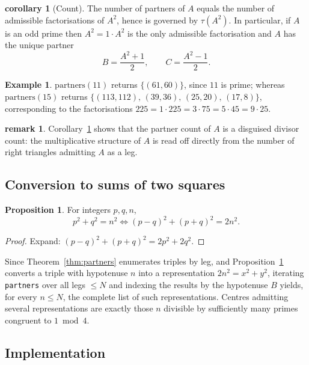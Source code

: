 \documentclass[11pt]{article}
\theoremstyle{definition}
\newtheorem{proposition}{Proposition}
\newtheorem{example}{Example}
\newtheorem{remark}{remark}
\newtheorem{corollary}{corollary}
\begin{document}
\begin{corollary}[Count]\label{cor:count}
The number of partners of $A$ equals the number of admissible factorisations
of $A^2$, hence is governed by $\tau(A^2)$. In particular, if $A$ is an odd
prime then $A^2 = 1 \cdot A^2$ is the only admissible factorisation and $A$ has
the unique partner
\[
  B = \frac{A^2+1}{2}, \qquad C = \frac{A^2-1}{2}.
\]
\end{corollary}

\begin{example}
$\mathrm{partners}(11)$ returns $\{(61,60)\}$, since $11$ is prime; whereas
$\mathrm{partners}(15)$ returns
$\{(113,112),\,(39,36),\,(25,20),\,(17,8)\}$, corresponding to the
factorisations $225 = 1\cdot225 = 3\cdot75 = 5\cdot45 = 9\cdot25$.
\end{example}

\begin{remark}
Corollary~\ref{cor:count} shows that the partner count of $A$ is a disguised
divisor count: the multiplicative structure of $A$ is read off directly from
the number of right triangles admitting $A$ as a leg.
\end{remark}

\subsection{Conversion to sums of two squares}

\begin{proposition}\label{prop:sumdiff}
For integers $p,q,n$,
\[
  p^2 + q^2 = n^2
  \iff
  (p-q)^2 + (p+q)^2 = 2n^2 .
\]
\end{proposition}

\begin{proof}
Expand: $(p-q)^2+(p+q)^2 = 2p^2+2q^2$.
\end{proof}

Since Theorem~\ref{thm:partners} enumerates triples by leg, and
Proposition~\ref{prop:sumdiff} converts a triple with hypotenuse $n$ into a
representation $2n^2 = x^2+y^2$, iterating \texttt{partners} over all legs
$\le N$ and indexing the results by the hypotenuse $B$ yields, for every
$n \le N$, the complete list of such representations. Centres admitting
several representations are exactly those $n$ divisible by sufficiently many
primes congruent to $1 \bmod 4$.

\subsection{Implementation}
\end{document}

